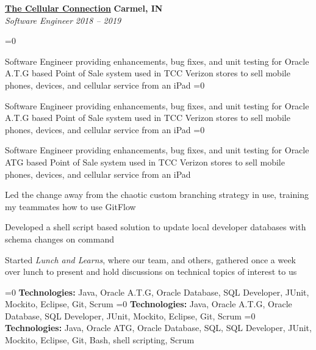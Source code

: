 %
    \headerrow
        {\textbf{\href{https://www.tccrocks.com/}{The Cellular Connection}}}
        {\textbf{Carmel, IN}}
    \\
    \headerrow
        {\emph{Software Engineer}}
        {\emph{2018 -- 2019}}
    \begin{itemize*}
        \ifnum{}=0
            \item Software Engineer providing enhancements, bug fixes, and unit testing for Oracle A.T.G
                based Point of Sale system used in TCC Verizon stores to sell mobile phones, devices, and cellular service from an iPad
        \fi
        \ifnum{}=0
            \item Software Engineer providing enhancements, bug fixes, and unit testing for Oracle A.T.G
                based Point of Sale system used in TCC Verizon stores to sell mobile phones, devices, and cellular service from an iPad
        \fi
        \ifnum{}=0
            \item Software Engineer providing enhancements, bug fixes, and unit testing for Oracle ATG
                based Point of Sale system used in TCC Verizon stores to sell mobile phones, devices, and cellular service from an iPad
        \fi
        \item Led the change away from the chaotic custom branching strategy in use, training my teammates how to use GitFlow
        \item Developed a shell script based solution to update local developer databases with schema changes on command
        \item Started \emph{Lunch and Learns}, where our team, and others, gathered once a week over lunch to present and hold
            discussions on technical topics of interest to us
    \end{itemize*}

    \ifnum{}=0
    \hspace{1.0em}
        {\textbf{Technologies:} Java, Oracle A.T.G, Oracle Database, SQL Developer, JUnit, Mockito, Eclipse, Git, Scrum}
    \fi
    \ifnum{}=0
    \hspace{1.0em}
        {\textbf{Technologies:} Java, Oracle A.T.G, Oracle Database, SQL Developer, JUnit, Mockito, Eclipse, Git, Scrum}
    \fi
    \ifnum{}=0
    \hspace{1.0em}
        {\textbf{Technologies:} Java, Oracle ATG, Oracle Database, SQL, SQL Developer, JUnit, Mockito, Eclipse, Git, Bash, shell scripting, Scrum}
    \fi

